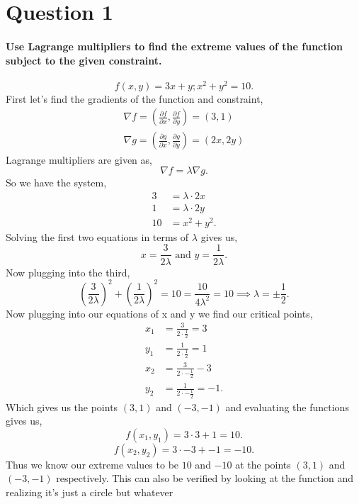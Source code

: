 \section{Question 1}%
\label{sec: Question 1 }
\paragraph{Use Lagrange multipliers to find the extreme values of the function subject to the given constraint.}
\[
f\left( x,y \right) = 3x+y; x^2+y^2=10
.\] 
First let's find the gradients of the function and constraint,
\begin{gather*}
\nabla f = \left( \frac{ \partial f}{\partial x} , \frac{ \partial f}{\partial y}  \right) = \left( 3,1 \right) \\
\nabla g = \left( \frac{ \partial g}{\partial x} , \frac{ \partial g}{\partial y}  \right) = \left( 2x,2y \right) 
\end{gather*}
Lagrange multipliers are given as,
\[
\nabla f = \lambda \nabla g
.\] 
So we have the system,
\begin{align*}
3&= \lambda \cdot 2x \\
1&= \lambda \cdot 2y \\
10 &= x^2 + y^2
.\end{align*}
Solving the first two equations in terms of $ \lambda $ gives us,
\[
x= \frac{ 3 }{ 2\lambda } \text{ and }y=\frac{ 1 }{ 2\lambda } 
.\] 
Now plugging into the third,
\[
	\left( \frac{ 3 }{ 2\lambda }  \right) ^2+\left( \frac{ 1 }{ 2\lambda }  \right) ^2 = 10 = \frac{ 10 }{ 4\lambda^2 } = 10 \implies \lambda = \pm \frac{ 1 }{ 2 } 
.\] 
Now plugging into our equations of x and y we find our critical points,
\begin{align*}
	x_1&= \frac{ 3 }{ 2 \cdot  \frac{ 1 }{ 2 }  } = 3 \\
	y_1&= \frac{ 1 }{ 2 \cdot \frac{ 1 }{ 2 }  } = 1 \\
	x_2 &= \frac{ 3 }{ 2\cdot -\frac{ 1 }{ 2 }  } -3 \\
	y_{ 2 } &= \frac{ 1 }{ 2 \cdot -\frac{ 1 }{ 2 }  } =-1
.\end{align*}
Which gives us the points $ \left( 3,1 \right) $ and $ \left( -3,-1 \right) $ and evaluating the functions gives us,
\[
f\left( x_1, y_1 \right) = 3 \cdot  3 + 1 = 10
.\] 
\[
f\left( x_2, y_2 \right) = 3 \cdot -3 + -1 = -10
.\] 
Thus we know our extreme values to be $ 10 $ and $ -10 $ at the points $ \left( 3,1 \right) $ and $ \left( -3,-1 \right) $ respectively. This can also be verified by looking at the function and realizing it's just a circle but whatever
